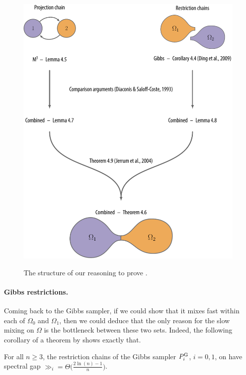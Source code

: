 \begin{figure}[tbp]
  \centering
  \includegraphics[width=\textwidth]{figures/m3/decomposition2.pdf}\\[2em]
  \caption{The structure of our reasoning to prove .}
  \label{fig:decomp}
\end{figure}

\paragraph{Gibbs restrictions.}
Coming back to the Gibbs sampler, if we could show that it mixes fast within each of $\Omega_0$ and $\Omega_1$, then we could deduce that the only reason for the slow mixing on $\Omega$ is the bottleneck between these two sets.
Indeed, the following corollary of a theorem by \cite{ding09} shows exactly that.
\begin{cor} \label{cor:grest}
  For all $n \geq 3$, the restriction chains of the Gibbs sampler $P^{\mathrm{G}}_i$, $i = 0, 1$, on \ising{} have spectral gap $\gg_i = \Theta\big(\displaystyle\tfrac{2\ln(n) - 1}{n}\big)$.
\end{cor}

